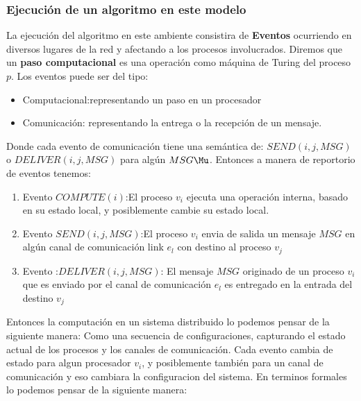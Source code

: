 \documentclass[10pt]{report}
\begin{document}
    \subsubsection{Ejecución de un algoritmo en este modelo}
    La ejecución del algoritmo en este ambiente consistira de \textbf{Eventos} ocurriendo en diversos
    lugares de la red y afectando a los procesos involucrados.
    Diremos que un \textbf{paso computacional} es una operación como máquina de Turing del proceso $p$.
    Los eventos puede ser del tipo:
    \begin{itemize}
        \item Computacional:representando un paso en un procesador
        \item Comunicación: representando la entrega o la recepción de un mensaje.
    \end{itemize}
    Donde cada evento de comunicación tiene una semántica de:
    $SEND(i,j,MSG)$ o $DELIVER(i,j,MSG)$ para algún $MSG\Mu$.
    Entonces a manera de reportorio de eventos tenemos:
    \begin{enumerate}
        \item Evento $COMPUTE(i)$:El proceso $v_{i}$ ejecuta una operación interna, basado en su estado local, y
        posiblemente cambie su estado local.
        \item Evento $SEND(i,j,MSG)$:El proceso $v_{i}$ envia de salida un mensaje $MSG$ en algún canal de
        comunicación link $e_{l}$ con destino al proceso $v_{j}$
        \item Evento :$DELIVER(i,j,MSG)$: El mensaje $MSG $ originado de un proceso $v_{i}$
        que es enviado por el canal de comunicación $e_{l}$ es entregado en la entrada del destino $v_{j}$
    \end{enumerate}
    Entonces la computación en un sistema distribuido lo podemos pensar de la siguiente manera:
    Como una secuencia de configuraciones, capturando el estado actual de los procesos y los canales de comunicación.\newline
    Cada evento cambia de estado para algun procesador $v_{i}$, y posiblemente también para un canal de comunicación
    y eso cambiara la configuracion del sistema.
    En terminos formales lo podemos pensar de la siguiente manera:
    \theoremstyle{definition}
\end{document}
